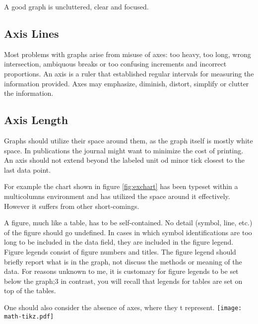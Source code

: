 A good graph is uncluttered, clear and focused.

\subsection{Axis Lines}

Most problems with graphs arise from misuse of axes: too heavy, too long, wrong intersection,
ambiquous breaks or too confusing increments and incorrect proportions. An axis is a ruler that established
regular intervals for measuring the information provided. Axes may emphasize, diminish, distort, simplify
or clutter the information.

\clearpage

\begin{multicols}{2}
\subsection{Axis Length}

Graphs should utilize their space around them, as the graph itself is mostly white space. In publications the journal might want to minimize the cost of printing. An axis should not extend beyond the labeled unit od minor tick closest to the last data point.

\captionsetup[figure]{format=hang, name=Fig, font=footnotesize}
\label{fig:exchart}
\medskip


For example the chart shown in figure \ref{fig:exchart} has been typeset within a multicolumns environment and has utilized the space around it effectively. However it suffers from other short-comings. 

A figure, much like a table, has to be self-contained. No detail (symbol, line, etc.) of the figure should go undefined. In cases in which symbol
identifications are too long to be included in the data field, they are
included in the figure legend. Figure legends consist of figure numbers
and titles. The figure legend should briefly report what is in the graph,
not discuss the methods or meaning of the data. For reasons unknown
to me, it is customary for figure legends to be set below the graph;3
in contrast, you will recall that legends for tables are set on top of the
tables. \cite{ivan2001}

One should also consider the absence of axes, where they t represent.
\texttt{[image: math-tikz.pdf]}
\end{multicols}


